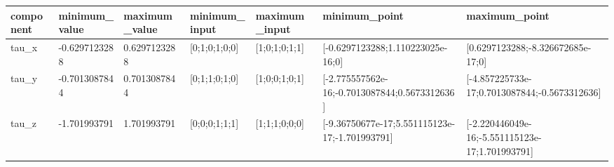 \begin{tabular}{@{}lllllll@{}}
\toprule
component & minimum\_value & maximum\_value & minimum\_input & maximum\_input & minimum\_point & maximum\_point \\
\midrule
tau\_x & -0.6297123288 & 0.6297123288 & [0;1;0;1;0;0] & [1;0;1;0;1;1] & [-0.6297123288;1.110223025e-16;0] & [0.6297123288;-8.326672685e-17;0] \\
tau\_y & -0.7013087844 & 0.7013087844 & [0;1;1;0;1;0] & [1;0;0;1;0;1] & [-2.775557562e-16;-0.7013087844;0.5673312636] & [-4.857225733e-17;0.7013087844;-0.5673312636] \\
tau\_z & -1.701993791 & 1.701993791 & [0;0;0;1;1;1] & [1;1;1;0;0;0] & [-9.36750677e-17;5.551115123e-17;-1.701993791] & [-2.220446049e-16;-5.551115123e-17;1.701993791] \\
\bottomrule
\end{tabular}
